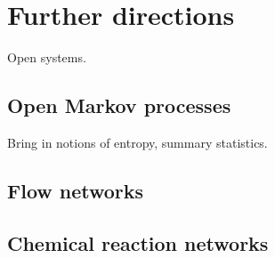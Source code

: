 \chapter{Further directions}

Open systems. 

\section{Open Markov processes}
Bring in notions of entropy, summary statistics. 
\section{Flow networks}

\section{Chemical reaction networks}
